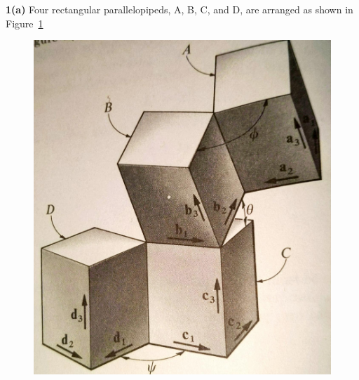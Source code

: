 \textbf{1(a)} Four rectangular parallelopipeds, A, B, C, and D, are arranged as shown in Figure~\ref{1a}

\begin{figure}[H]
    \centering
    \includegraphics[scale = 0.1]{./figs/pset_1/1_a.jpg}
    \caption{}
    \label{1a}
\end{figure}

